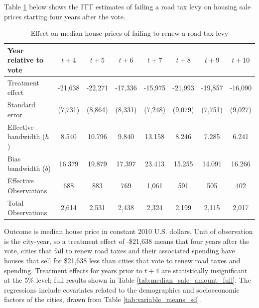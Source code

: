  Table \ref{tab:median_sale_amount} below shows the ITT estimates of failing a road tax levy on housing sale prices starting four years after the vote. 

 \begin{table}[ht]
    \centering
    \caption{Effect on median house prices of failing to renew a road tax levy}
    \label{tab:median_sale_amount}
    \begin{tabular}{p{2cm}ccccccc}
        \hline
        Year relative to vote & $t + 4$ & $t + 5$ & $t + 6$ & $t + 7$ & $t + 8$ & $t + 9$ & $t + 10$ \\
        \hline
        Treatment effect & -21,638 & -22,271 & -17,336 & -15,975 & -21,993 & -19,857 & -16,090 \\
        Standard error   & (7,731) & (8,864) & (8,331) & (7,248) & (9,079) & (7,751) & (9,027) \\
        Effective bandwidth ($h$) & 8.540 & 10.796 & 9.840 & 13.158 & 8.246 & 7.285 & 6.241 \\
        Bias bandwidth ($b$) & 16.379 & 19.879 & 17.397 & 23.413 & 15.255 & 14.091 & 16.266 \\
        Effective Observations & 688 & 883 & 769 & 1,061 & 591 & 505 & 402 \\
        Total Observations & 2,614 & 2,531 & 2,438 & 2,324 & 2,199 & 2,115 & 2,017 \\
        \hline
    \end{tabular}
    \begin{tablenotes}
        \small
        \item Outcome is median house price in constant 2010 U.S. dollars. Unit of observation is the city-year, so a treatment effect of -\$21,638 means that four years after the vote, cities that fail to renew road taxes and their associated spending have houses that sell for \$21,638 less than cities that vote to renew road taxes and spending. Treatment effects for years prior to $t + 4$ are statistically insignificant at the 5\% level; full results shown in Table \ref{tab:median_sale_amount_full}. The regressions include covariates related to the demographics and socioeconomic factors of the cities, drawn from Table \ref{tab:variable_means_sd}.
    \end{tablenotes}
\end{table}


